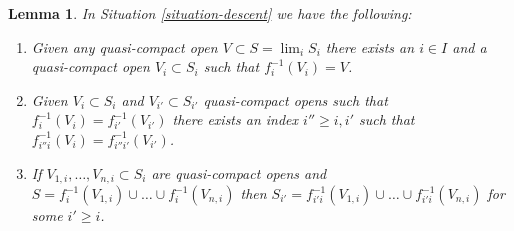 \documentclass{stacks-project}
\theoremstyle{plain}
\newtheorem{lemma}[subsection]{Lemma}
\theoremstyle{definition}
\theoremstyle{remark}
\numberwithin{equation}{subsection}
\def\lim{\mathop{\mathrm{lim}}\nolimits}
\begin{document}
\begin{lemma}
\label{lemma-descend-opens}
In Situation \ref{situation-descent} we have the following:
\begin{enumerate}
\item Given any quasi-compact open $V \subset S = \lim_i S_i$
there exists an $i \in I$ and a quasi-compact open $V_i \subset S_i$
such that $f_i^{-1}(V_i) = V$.
\item Given $V_i \subset S_i$ and $V_{i'} \subset S_{i'}$
quasi-compact opens such that $f_i^{-1}(V_i) = f_{i'}^{-1}(V_{i'})$
there exists an index $i'' \geq i, i'$ such that
$f_{i''i}^{-1}(V_i) = f_{i''i'}^{-1}(V_{i'})$.
\item If $V_{1, i}, \ldots, V_{n, i} \subset S_i$ are quasi-compact
opens and $S = f_i^{-1}(V_{1, i}) \cup \ldots \cup f_i^{-1}(V_{n, i})$
then $S_{i'} = f_{i'i}^{-1}(V_{1, i}) \cup \ldots \cup f_{i'i}^{-1}(V_{n, i})$
for some $i' \geq i$.
\end{enumerate}
\end{lemma}
\end{document}
